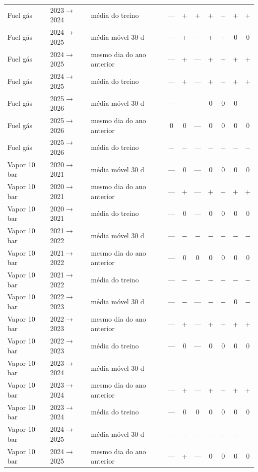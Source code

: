 {\begin{xltabular}{\linewidth}{@{}llp{2.6cm}ccccccc@{}}
Fuel gás & 2023$\to$2024 & média do treino & --- & + & + & + & + & + & + \\
Fuel gás & 2024$\to$2025 & média móvel 30 d & --- & + & --- & + & + & 0 & 0 \\
Fuel gás & 2024$\to$2025 & mesmo dia do ano anterior & --- & + & --- & + & + & + & + \\
Fuel gás & 2024$\to$2025 & média do treino & --- & + & --- & + & + & + & + \\
Fuel gás & 2025$\to$2026 & média móvel 30 d & $-$ & $-$ & --- & 0 & 0 & 0 & $-$ \\
Fuel gás & 2025$\to$2026 & mesmo dia do ano anterior & 0 & 0 & --- & 0 & 0 & 0 & 0 \\
Fuel gás & 2025$\to$2026 & média do treino & $-$ & $-$ & --- & $-$ & $-$ & $-$ & $-$ \\
Vapor 10 bar & 2020$\to$2021 & média móvel 30 d & --- & 0 & --- & 0 & 0 & 0 & 0 \\
Vapor 10 bar & 2020$\to$2021 & mesmo dia do ano anterior & --- & + & --- & + & + & + & + \\
Vapor 10 bar & 2020$\to$2021 & média do treino & --- & 0 & --- & 0 & 0 & 0 & 0 \\
Vapor 10 bar & 2021$\to$2022 & média móvel 30 d & --- & $-$ & $-$ & $-$ & $-$ & $-$ & $-$ \\
Vapor 10 bar & 2021$\to$2022 & mesmo dia do ano anterior & --- & 0 & 0 & 0 & 0 & 0 & 0 \\
Vapor 10 bar & 2021$\to$2022 & média do treino & --- & $-$ & $-$ & $-$ & $-$ & $-$ & $-$ \\
Vapor 10 bar & 2022$\to$2023 & média móvel 30 d & --- & $-$ & --- & $-$ & $-$ & 0 & $-$ \\
Vapor 10 bar & 2022$\to$2023 & mesmo dia do ano anterior & --- & + & --- & + & + & + & + \\
Vapor 10 bar & 2022$\to$2023 & média do treino & --- & 0 & --- & 0 & 0 & 0 & 0 \\
Vapor 10 bar & 2023$\to$2024 & média móvel 30 d & --- & $-$ & $-$ & $-$ & $-$ & $-$ & $-$ \\
Vapor 10 bar & 2023$\to$2024 & mesmo dia do ano anterior & --- & + & --- & + & + & + & + \\
Vapor 10 bar & 2023$\to$2024 & média do treino & --- & 0 & 0 & 0 & 0 & 0 & 0 \\
Vapor 10 bar & 2024$\to$2025 & média móvel 30 d & --- & $-$ & --- & $-$ & $-$ & $-$ & $-$ \\
Vapor 10 bar & 2024$\to$2025 & mesmo dia do ano anterior & --- & + & --- & 0 & 0 & 0 & 0 \\

\end{xltabular}}
